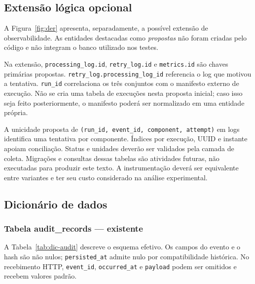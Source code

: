 \subsection{Extensão lógica opcional}
A Figura~\ref{fig:der} apresenta, separadamente, a possível extensão de observabilidade. As entidades destacadas como \textit{propostas} não foram criadas pelo código e não integram o banco utilizado nos testes.


Na extensão, \texttt{processing\_log.id}, \texttt{retry\_log.id} e \texttt{metrics.id} são chaves primárias propostas. \texttt{retry\_log.processing\_log\_id} referencia o log que motivou a tentativa. \texttt{run\_id} correlaciona os três conjuntos com o manifesto externo de execução. Não se cria uma tabela de execuções nesta proposta inicial; caso isso seja feito posteriormente, o manifesto poderá ser normalizado em uma entidade própria.

A unicidade proposta de \texttt{(run\_id, event\_id, component, attempt)} em logs identifica uma tentativa por componente. Índices por execução, UUID e instante apoiam conciliação. Status e unidades deverão ser validados pela camada de coleta. Migrações e consultas dessas tabelas são atividades futuras, não executadas para produzir este texto. A instrumentação deverá ser equivalente entre variantes e ter seu custo considerado na análise experimental.

\FloatBarrier
\subsection{Dicionário de dados}

\subsubsection{Tabela audit\_records --- existente}
A Tabela~\ref{tab:dic-audit} descreve o esquema efetivo. Os campos do evento e o hash são não nulos; \texttt{persisted\_at} admite nulo por compatibilidade histórica. No recebimento HTTP, \texttt{event\_id}, \texttt{occurred\_at} e \texttt{payload} podem ser omitidos e recebem valores padrão.

